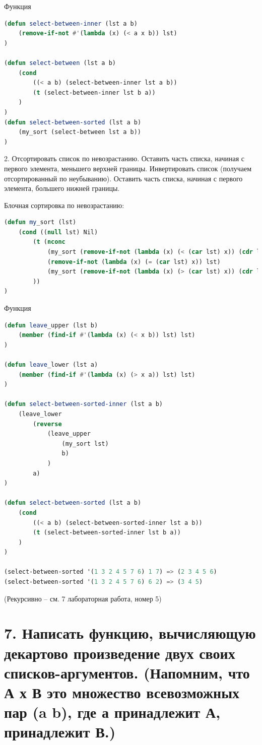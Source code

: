 \documentclass[12pt]{report}
\begin{document}
Функция
\begin{lstlisting}[language=Lisp]	
(defun select-between-inner (lst a b)
	(remove-if-not #'(lambda (x) (< a x b)) lst)
)

(defun select-between (lst a b)
	(cond 
		((< a b) (select-between-inner lst a b))
		(t (select-between-inner lst b a))
	)
)
(defun select-between-sorted (lst a b)
	(my_sort (select-between lst a b))
)
\end{lstlisting}


2. Отсортировать список по невозрастанию. Оставить часть списка, начиная с первого элемента, меньшего верхней границы. Инвертировать список (получаем отсортированный по неубыванию). Оставить часть списка, начиная с первого элемента, большего нижней границы.

Блочная сортировка по невозрастанию:
\begin{lstlisting}[language=Lisp]
(defun my_sort (lst)
	(cond ((null lst) Nil)
		(t (nconc 
			(my_sort (remove-if-not (lambda (x) (< (car lst) x)) (cdr lst)))
			(remove-if-not (lambda (x) (= (car lst) x)) lst)
			(my_sort (remove-if-not (lambda (x) (> (car lst) x)) (cdr lst))))
		))
)
\end{lstlisting}

Функция
\begin{lstlisting}[language=Lisp]
(defun leave_upper (lst b)
	(member (find-if #'(lambda (x) (< x b)) lst) lst)
)
	
(defun leave_lower (lst a)
	(member (find-if #'(lambda (x) (> x a)) lst) lst)
)

(defun select-between-sorted-inner (lst a b)
	(leave_lower 
		(reverse 
			(leave_upper 
				(my_sort lst) 
				b)
			)
		a)
)

(defun select-between-sorted (lst a b)
	(cond
		((< a b) (select-between-sorted-inner lst a b))
		(t (select-between-sorted-inner lst b a))
	)
)

(select-between-sorted '(1 3 2 4 5 7 6) 1 7) => (2 3 4 5 6)
(select-between-sorted '(1 3 2 4 5 7 6) 6 2) => (3 4 5)
\end{lstlisting}

(Рекурсивно -- см. 7 лабораторная работа, номер 5)

\section*{7. Написать функцию, вычисляющую декартово произведение двух своих списков-аргументов. (Напомним, что А х В это множество всевозможных пар (a b), где а принадлежит А, принадлежит В.)}
\end{document}

